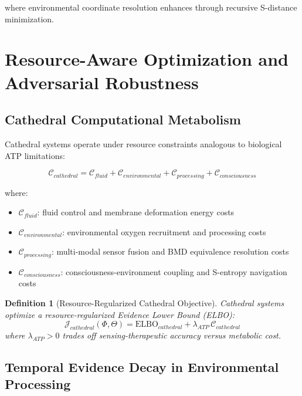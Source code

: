 \documentclass[12pt,a4paper]{article}
\newtheorem{definition}{Definition}
\begin{document}
where environmental coordinate resolution enhances through recursive S-distance minimization.

\section{Resource-Aware Optimization and Adversarial Robustness}

\subsection{Cathedral Computational Metabolism}

Cathedral systems operate under resource constraints analogous to biological ATP limitations:

\begin{equation}
\mathcal{C}_{cathedral} = \mathcal{C}_{fluid} + \mathcal{C}_{environmental} + \mathcal{C}_{processing} + \mathcal{C}_{consciousness}
\end{equation}

where:
\begin{itemize}
\item $\mathcal{C}_{fluid}$: fluid control and membrane deformation energy costs
\item $\mathcal{C}_{environmental}$: environmental oxygen recruitment and processing costs
\item $\mathcal{C}_{processing}$: multi-modal sensor fusion and BMD equivalence resolution costs
\item $\mathcal{C}_{consciousness}$: consciousness-environment coupling and S-entropy navigation costs
\end{itemize}

\begin{definition}[Resource-Regularized Cathedral Objective]
Cathedral systems optimize a resource-regularized Evidence Lower Bound (ELBO):
\begin{equation}
\mathcal{J}_{cathedral}(\Phi,\Theta) = \text{ELBO}_{cathedral} + \lambda_{ATP} \, \mathcal{C}_{cathedral}
\end{equation}
where $\lambda_{ATP} > 0$ trades off sensing-therapeutic accuracy versus metabolic cost.
\end{definition}

\subsection{Temporal Evidence Decay in Environmental Processing}
\end{document}
